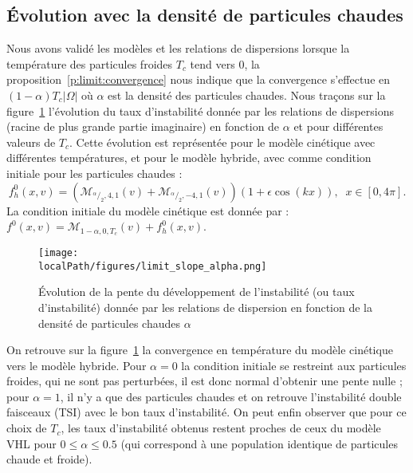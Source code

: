 \subsection{Évolution avec la densité de particules chaudes}

Nous avons validé les modèles et les relations de dispersions lorsque la température des particules froides $T_c$ tend vers $0$, la proposition~\ref{p:limit:convergence} nous indique que la convergence s'effectue en $(1-\alpha)T_c|\Omega|$ où $\alpha$ est la densité des particules chaudes. 
Nous traçons sur la figure~\ref{fig:limit:slope:alpha} l'évolution du taux d'instabilité donnée par les relations de dispersions (racine de plus grande partie imaginaire) en fonction de $\alpha$ et pour diff\'erentes valeurs de $T_c$. Cette évolution est représentée pour le modèle cinétique avec différentes températures, et  pour le modèle hybride, avec comme condition initiale pour les particules chaudes :
$$
  f_h^0(x,v) = \left(\mathcal{M}_{^\alpha/_2,4,1}(v) + \mathcal{M}_{^\alpha/_2,-4,1}(v)\right)(1+\epsilon\cos\left(k x\right)), \;\; x\in [0, 4\pi]. 
$$
La condition initiale du modèle cinétique est donnée par : $f^0(x,v) = \mathcal{M}_{1-\alpha,0,T_c}(v) + f_h^0(x,v)$.
\begin{figure}[h!]
  \centering
  \texttt{[image: \\localPath/figures/limit\_slope\_alpha.png]}
  \caption{Évolution de la pente du développement de l'instabilité (ou taux d'instabilité) donnée par les relations de dispersion en fonction de la densité de particules chaudes $\alpha$}
  \label{fig:limit:slope:alpha}
\end{figure}
On retrouve sur la figure~\ref{fig:limit:slope:alpha} la convergence en température du modèle cinétique vers le modèle hybride. Pour $\alpha=0$ la condition initiale se restreint aux particules froides, qui ne sont pas perturbées, il est donc normal d'obtenir une pente nulle ; pour $\alpha=1$, il n'y a que des particules chaudes et on retrouve l'instabilité double faisceaux (TSI) avec le bon taux d'instabilité.
On peut enfin observer que pour ce choix de $T_c$, les taux d'instabilit\'e obtenus restent proches de ceux du mod\`ele VHL 
pour $0\leq \alpha \leq 0.5$ (qui correspond \`a une population identique de particules chaude et froide).

